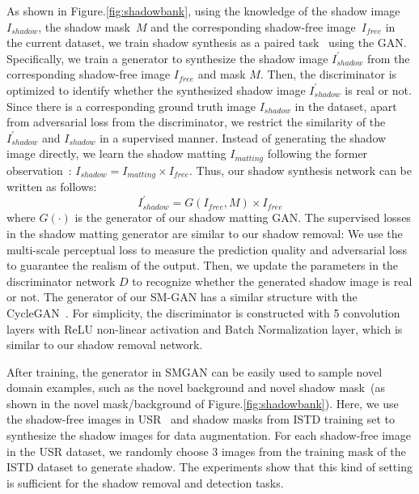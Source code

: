 \documentclass[letterpaper]{article} \usepackage{aaai20}  \usepackage{times}  \usepackage{helvet} \usepackage{courier}  \usepackage[hyphens]{url}  \urlstyle{rm} \def\UrlFont{\rm}  \usepackage{graphicx}  \frenchspacing  \setlength{\pdfpagewidth}{8.5in}  \setlength{\pdfpageheight}{11in}  \usepackage{amssymb}
\begin{document}
As shown in Figure.\ref{fig:shadowbank}, using the knowledge of the shadow image~$I_{shadow}$, the shadow mask~$M$ and the corresponding shadow-free image~$I_{free}$ in the current dataset, we train shadow synthesis as a paired task~\cite{isola2017image} using the GAN. Specifically, we train a generator to synthesize the shadow image $I_{shadow}^{'}$ from the corresponding shadow-free image $I_{free}$ and mask $M$. Then, the discriminator is optimized to identify whether the synthesized shadow image $I_{shadow}^{'}$ is real or not. Since there is a corresponding ground truth image $I_{shadow}$ in the dataset, apart from adversarial loss from the discriminator, we restrict the similarity of the $I_{shadow}^{'}$ and $I_{shadow}$ in a supervised manner. Instead of generating the shadow image directly, we learn the shadow matting $I_{matting}$ following the former observation~\cite{qu2017deshadownet}: $I_{shadow} =  I_{matting} \times I_{free}  $. Thus, our shadow synthesis network can be written as follows:
\begin{equation}
  I_{shadow}^{'} = G(I_{free},M) \times I_{free}
\end{equation}
where $G(\cdot)$ is the generator of our shadow matting GAN. The supervised losses in the shadow matting generator are similar to our shadow removal: We use the multi-scale perceptual loss to measure the prediction quality and adversarial loss to guarantee the realism of the output.
Then, we update the parameters in the discriminator network $D$ to recognize whether the generated shadow image is real or not. The generator of our SM-GAN has a similar structure with the CycleGAN~\cite{Zhu:2017ua}. 
For simplicity, the discriminator is constructed with 5 convolution layers with ReLU non-linear activation and Batch Normalization layer, which is  similar to our shadow removal network.



After training, the generator in SMGAN can be easily used to sample novel domain examples, such as the novel background and novel shadow mask~(as shown in the novel mask/background of Figure.\ref{fig:shadowbank}). 
Here, we use the shadow-free images in USR~\cite{Anonymous:XfCvZjhb} and shadow masks from ISTD training set to synthesize the shadow images for data augmentation. For each shadow-free image in the USR dataset, we randomly choose 3 images from the training mask of the ISTD dataset to generate shadow. The experiments show that this kind of setting is sufficient for the shadow removal and detection tasks. 
\end{document}
